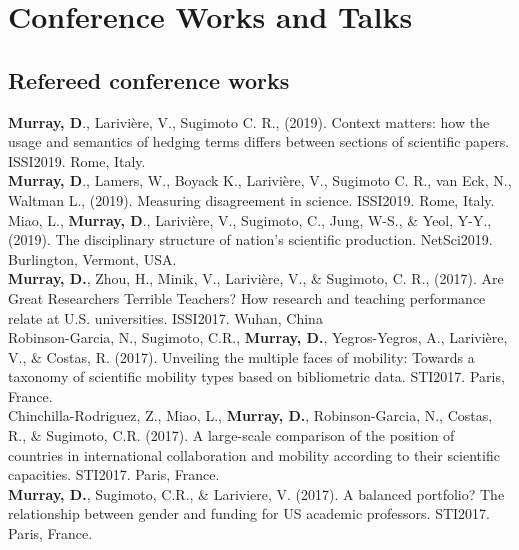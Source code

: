 \documentclass[10pt, a4paper]{article}
\newcommand{\years}[1]{\marginnote{\scriptsize #1}}
\begin{document}
\section*{Conference Works and Talks}

\subsection*{Refereed conference works}

\years{2019} \hangindent=0.7cm \textbf{Murray, D}., Larivière, V., Sugimoto C. R., (2019). Context matters: how the usage and semantics of hedging terms differs between sections of scientific papers. ISSI2019. Rome, Italy.\\

\years{2019} \hangindent=0.7cm  \textbf{Murray, D}., Lamers, W., Boyack K., Larivière, V., Sugimoto C. R., van Eck, N., Waltman L., (2019). Measuring disagreement in science. ISSI2019. Rome, Italy.\\

\years{2019} \hangindent=0.7cm Miao, L., \textbf{Murray, D}., Larivière, V., Sugimoto, C., Jung, W-S., \&  Yeol, Y-Y., (2019). The disciplinary structure of nation's scientific production. NetSci2019. Burlington, Vermont, USA.\\

\years{2017} \hangindent=0.7cm \textbf{Murray, D.}, Zhou, H., Minik, V., Larivière, V., \& Sugimoto, C. R., (2017). Are Great Researchers Terrible Teachers? How research and teaching performance relate at U.S. universities. ISSI2017. Wuhan, China\\

\years{2017} \hangindent=0.7cm Robinson-Garcia, N., Sugimoto, C.R., \textbf{Murray, D.}, Yegros-Yegros, A., Larivière, V., \& Costas, R. (2017). Unveiling the multiple faces of mobility: Towards a taxonomy of scientific mobility types based on bibliometric data. STI2017. Paris, France.\\

\years{2017} \hangindent=0.7cm Chinchilla-Rodriguez, Z., Miao, L., \textbf{Murray, D.}, Robinson-Garcia, N., Costas, R., \& Sugimoto, C.R. (2017). A large-scale comparison of the position of countries in international collaboration and mobility according to their scientific capacities. STI2017. Paris, France.\\

\years{2017} \hangindent=0.7cm \textbf{Murray, D.}, Sugimoto, C.R., \& Lariviere, V. (2017). A balanced portfolio? The relationship between gender and funding for US academic professors. STI2017. Paris, France.\\
\end{document}
